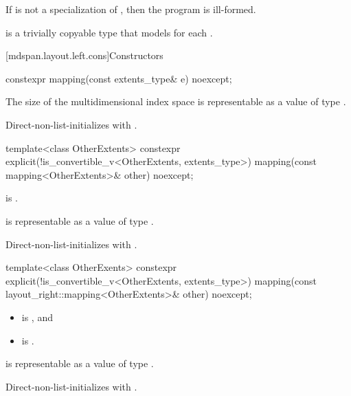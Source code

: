 \pnum
If  is not a specialization of ,
then the program is ill-formed.

\pnum
{} is a trivially copyable type
that models  for each .

[mdspan.layout.left.cons]{Constructors}

%
\begin{itemdecl}
constexpr mapping(const extents_type& e) noexcept;
\end{itemdecl}

\begin{itemdescr}
\pnum
\expects
The size of the multidimensional index space 
is representable as a value of type .

\pnum
\effects
Direct-non-list-initializes  with .
\end{itemdescr}

%
\begin{itemdecl}
template<class OtherExtents>
  constexpr explicit(!is_convertible_v<OtherExtents, extents_type>)
    mapping(const mapping<OtherExtents>& other) noexcept;
\end{itemdecl}

\begin{itemdescr}
\pnum
\constraints
{} is .

\pnum
\expects
{} is representable as
a value of type .

\pnum
\effects
Direct-non-list-initializes  with .
\end{itemdescr}

%
\begin{itemdecl}
template<class OtherExents>
  constexpr explicit(!is_convertible_v<OtherExtents, extents_type>)
    mapping(const layout_right::mapping<OtherExtents>& other) noexcept;
\end{itemdecl}

\begin{itemdescr}
\pnum
\constraints
\begin{itemize}
\item
{} is , and
\item
{} is .
\end{itemize}

\pnum
\expects
{} is representable as
a value of type .

\pnum
\effects
Direct-non-list-initializes  with .
\end{itemdescr}

